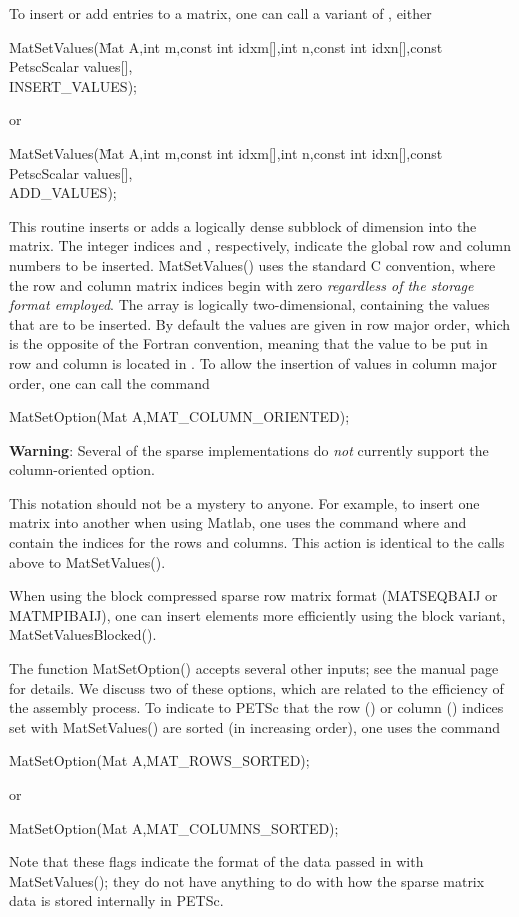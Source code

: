 To insert or add entries to a matrix, one can call a variant of , either 
\begin{tabbing}
  MatSetValues(\=Mat A,int m,const int idxm[],int n,const int idxn[],const PetscScalar values[],\\
            \>INSERT\_VALUES);
\end{tabbing}
or 
\begin{tabbing}
  MatSetValues(\=Mat A,int m,const int idxm[],int n,const int idxn[],const PetscScalar values[],\\
            \>ADD\_VALUES);
\end{tabbing}
This routine inserts or adds a logically dense subblock of dimension
 into the 
matrix. The integer indices  and , respectively, indicate the 
global row and column numbers to be inserted.  MatSetValues() uses the 
standard C convention, where the row and column matrix indices begin with 
zero {\em regardless of the storage format employed}.   The array 
 is logically two-dimensional, containing the values that are 
to be inserted. By default the values are given in row major order, which is the
opposite of the Fortran convention, meaning that the value to be put in row
 and column  is located in . To
allow the insertion of values in column major order, one can call the command
\begin{tabbing}
  MatSetOption(Mat A,MAT\_COLUMN\_ORIENTED);
\end{tabbing}
{\bf Warning}: Several of the sparse implementations do {\em not} currently
support the column-oriented option.

This notation should not be a mystery to anyone. For example, 
to insert one matrix into another when using Matlab, one uses the command 
 where  and  contain the indices for the
rows and columns. This action is identical to the calls above to 
MatSetValues().

When using the block compressed sparse row matrix format (MATSEQBAIJ or
MATMPIBAIJ), one can insert elements more efficiently using the block
variant, MatSetValuesBlocked(). 

The function MatSetOption() accepts several other inputs; see
the manual page for details. We
discuss two of these options, which are related to the efficiency of the
assembly process.  To indicate to PETSc that the row () or
column () indices set with MatSetValues() are sorted (in increasing order),
one uses the command  
\begin{tabbing}
  MatSetOption(Mat A,MAT\_ROWS\_SORTED);
\end{tabbing}
or 
\begin{tabbing}
  MatSetOption(Mat A,MAT\_COLUMNS\_SORTED);
\end{tabbing}
Note that these flags indicate the format of the data passed in with 
MatSetValues(); they do not have anything to do with how the sparse
matrix data is stored internally in PETSc.


